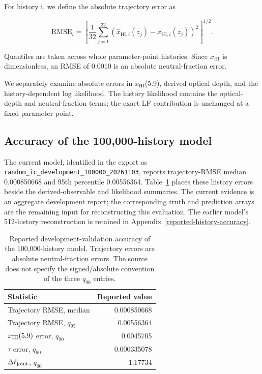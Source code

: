 For history i, we define the absolute trajectory error as

\[
\mathrm{RMSE}_i=\left[\frac{1}{32}\sum_{j=1}^{32}
\left(\widehat{x}_{\mathrm{HI},i}(z_j)-x_{\mathrm{HI},i}(z_j)\right)^2\right]^{1/2}.
\]

Quantiles are taken across whole parameter-point histories. Since \ensuremath{x_{\mathrm{HI}}} is dimensionless, an RMSE of 0.0010 is an absolute neutral-fraction error.

We separately examine absolute errors in \ensuremath{x_{\mathrm{HI}}}(5.9), derived optical depth, and the history-dependent log likelihood. The history likelihood contains the optical-depth and neutral-fraction terms; the exact LF contribution is unchanged at a fixed parameter point.

\subsection{Accuracy of the 100,000-history model}\label{new-model-validation}

The current model, identified in the export as \texttt{random\_ic\_development\_100000\_20261103}, reports trajectory-RMSE median 0.000850668 and 95th percentile 0.00556364. Table~\ref{tab:100k-validation} places these history errors beside the derived-observable and likelihood summaries. The current evidence is an aggregate development report; the corresponding truth and prediction arrays are the remaining input for reconstructing this evaluation. The earlier model's 512-history reconstruction is retained in Appendix~\ref{reported-history-accuracy}.

\begin{table}[t]\centering\small
\caption{Reported development-validation accuracy of the 100,000-history model. Trajectory errors are absolute neutral-fraction errors. The source does not specify the signed/absolute convention of the three $q_{90}$ entries.}\label{tab:100k-validation}
\begin{tabular}{lr}\toprule
Statistic & Reported value\\\midrule
Trajectory RMSE, median & 0.000850668\\
Trajectory RMSE, $q_{95}$ & 0.00556364\\
$x_{\rm HI}(5.9)$ error, $q_{90}$ & 0.0045705\\
$\tau$ error, $q_{90}$ & 0.000335078\\
$\Delta\ell_{\rm joint}$, $q_{90}$ & 1.17734\\
\bottomrule\end{tabular}\end{table}

